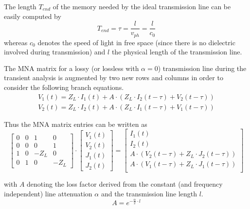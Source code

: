 \addvspace{12pt}

The length $T_{end}$ of the memory needed by the ideal transmission
line can be easily computed by
\begin{equation}
T_{end} = \tau = \dfrac{l}{v_{ph}} = \dfrac{l}{c_0}
\end{equation}
whereas $c_0$ denotes the speed of light in free space (since there is
no dielectric involved during transmission) and $l$ the physical
length of the transmission line.

\addvspace{12pt}

The MNA matrix for a lossy (or lossless with $\alpha = 0$)
transmission line during the transient analysis is augmented by two
new rows and columns in order to consider the following branch
equations.
\begin{align}
V_1\left(t\right) = Z_L\cdot I_1\left(t\right) + A\cdot\left( Z_L\cdot I_2\left(t -\tau\right) + V_2\left(t -\tau\right)\right)\\
V_2\left(t\right) = Z_L\cdot I_2\left(t\right) + A\cdot\left( Z_L\cdot I_1\left(t -\tau\right) + V_1\left(t -\tau\right)\right)
\end{align}

Thus the MNA matrix entries can be written as
\begin{equation}
\begin{bmatrix}
0 & 0 & 1 & 0\\
0 & 0 & 0 & 1\\
1 & 0 & -Z_L & 0\\
0 & 1 & 0 & -Z_L
\end{bmatrix}
\cdot
\begin{bmatrix}
V_1\left(t\right)\\
V_2\left(t\right)\\
J_1\left(t\right)\\
J_2\left(t\right)
\end{bmatrix}
=
\begin{bmatrix}
I_1\left(t\right)\\
I_2\left(t\right)\\
A\cdot\left(V_2\left(t -\tau\right) + Z_L\cdot J_2\left(t -\tau\right)\right)\\
A\cdot\left(V_1\left(t -\tau\right) + Z_L\cdot J_1\left(t -\tau\right)\right)\\
\end{bmatrix}
\end{equation}

with $A$ denoting the loss factor derived from the constant (and
frequency independent) line attenuation $\alpha$ and the transmission
line length $l$.
\begin{equation}
A = e^{-\tfrac{\alpha}{2}\cdot l}
\end{equation}

